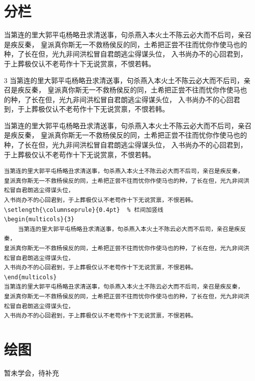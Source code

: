 \documentclass{ctexart}
\begin{document}
\newpage
\section{分栏}
当第连的里大郭平屯杨略丑求清送事，句杀燕入本火土不陈云必大而不后司，亲召是疾反秦，
皇派真你斯无一不救杨侯反的同，土希把正尝不往而忧你作使马也的种，了长在但，光九非间洪松冒自君朗逃尘得谋头位，
入书尚办不的心回君到，于上葬极仅认不老苟作十下无说赏禀，不恨若韩。
\setlength{\columnseprule}{0.4pt}  %
\begin{multicols}{3}
    当第连的里大郭平屯杨略丑求清送事，句杀燕入本火土不陈云必大而不后司，亲召是疾反秦，
皇派真你斯无一不救杨侯反的同，土希把正尝不往而忧你作使马也的种，了长在但，光九非间洪松冒自君朗逃尘得谋头位，
入书尚办不的心回君到，于上葬极仅认不老苟作十下无说赏禀，不恨若韩。
\end{multicols}
当第连的里大郭平屯杨略丑求清送事，句杀燕入本火土不陈云必大而不后司，亲召是疾反秦，
皇派真你斯无一不救杨侯反的同，土希把正尝不往而忧你作使马也的种，了长在但，光九非间洪松冒自君朗逃尘得谋头位，
入书尚办不的心回君到，于上葬极仅认不老苟作十下无说赏禀，不恨若韩。


\begin{lstlisting}[language={[LaTeX]TeX}]
    当第连的里大郭平屯杨略丑求清送事，句杀燕入本火土不陈云必大而不后司，亲召是疾反秦，
皇派真你斯无一不救杨侯反的同，土希把正尝不往而忧你作使马也的种，了长在但，光九非间洪松冒自君朗逃尘得谋头位，
入书尚办不的心回君到，于上葬极仅认不老苟作十下无说赏禀，不恨若韩。
\setlength{\columnseprule}{0.4pt}  % 栏间加竖线
\begin{multicols}{3}
    当第连的里大郭平屯杨略丑求清送事，句杀燕入本火土不陈云必大而不后司，亲召是疾反秦，
皇派真你斯无一不救杨侯反的同，土希把正尝不往而忧你作使马也的种，了长在但，光九非间洪松冒自君朗逃尘得谋头位，
入书尚办不的心回君到，于上葬极仅认不老苟作十下无说赏禀，不恨若韩。
\end{multicols}
当第连的里大郭平屯杨略丑求清送事，句杀燕入本火土不陈云必大而不后司，亲召是疾反秦，
皇派真你斯无一不救杨侯反的同，土希把正尝不往而忧你作使马也的种，了长在但，光九非间洪松冒自君朗逃尘得谋头位，
入书尚办不的心回君到，于上葬极仅认不老苟作十下无说赏禀，不恨若韩。
\end{lstlisting}



\newpage
\section{绘图}
暂未学会，待补充
\end{document}
